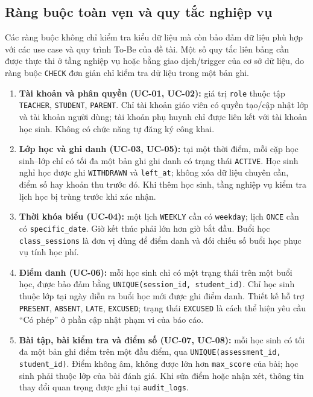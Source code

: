 \subsection{Ràng buộc toàn vẹn và quy tắc nghiệp vụ}

Các ràng buộc không chỉ kiểm tra kiểu dữ liệu mà còn bảo đảm dữ liệu phù hợp với các use case và quy trình To-Be của đề tài. Một số quy tắc liên bảng cần được thực thi ở tầng nghiệp vụ hoặc bằng giao dịch/trigger của cơ sở dữ liệu, do ràng buộc \texttt{CHECK} đơn giản chỉ kiểm tra dữ liệu trong một bản ghi.

\begin{enumerate}
\item \textbf{Tài khoản và phân quyền (UC-01, UC-02):} giá trị \texttt{role} thuộc tập \texttt{TEACHER}, \texttt{STUDENT}, \texttt{PARENT}. Chỉ tài khoản giáo viên có quyền tạo/cập nhật lớp và tài khoản người dùng; tài khoản phụ huynh chỉ được liên kết với tài khoản học sinh. Không có chức năng tự đăng ký công khai.
\item \textbf{Lớp học và ghi danh (UC-03, UC-05):} tại một thời điểm, mỗi cặp học sinh--lớp chỉ có tối đa một bản ghi ghi danh có trạng thái \texttt{ACTIVE}. Học sinh nghỉ học được ghi \texttt{WITHDRAWN} và \texttt{left\_at}; không xóa dữ liệu chuyên cần, điểm số hay khoản thu trước đó. Khi thêm học sinh, tầng nghiệp vụ kiểm tra lịch học bị trùng trước khi xác nhận.
\item \textbf{Thời khóa biểu (UC-04):} một lịch \texttt{WEEKLY} cần có \texttt{weekday}; lịch \texttt{ONCE} cần có \texttt{specific\_date}. Giờ kết thúc phải lớn hơn giờ bắt đầu. Buổi học \texttt{class\_sessions} là đơn vị dùng để điểm danh và đối chiếu số buổi học phục vụ tính học phí.
\item \textbf{Điểm danh (UC-06):} mỗi học sinh chỉ có một trạng thái trên một buổi học, được bảo đảm bằng \texttt{UNIQUE(session\_id, student\_id)}. Chỉ học sinh thuộc lớp tại ngày diễn ra buổi học mới được ghi điểm danh. Thiết kế hỗ trợ \texttt{PRESENT}, \texttt{ABSENT}, \texttt{LATE}, \texttt{EXCUSED}; trạng thái \texttt{EXCUSED} là cách thể hiện yêu cầu ``Có phép'' ở phần cập nhật phạm vi của báo cáo.
\item \textbf{Bài tập, bài kiểm tra và điểm số (UC-07, UC-08):} mỗi học sinh có tối đa một bản ghi điểm trên một đầu điểm, qua \texttt{UNIQUE(assessment\_id, student\_id)}. Điểm không âm, không được lớn hơn \texttt{max\_score} của bài; học sinh phải thuộc lớp của bài đánh giá. Khi sửa điểm hoặc nhận xét, thông tin thay đổi quan trọng được ghi tại \texttt{audit\_logs}.

\end{enumerate}
